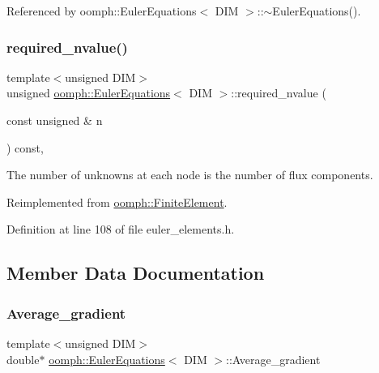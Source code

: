 Referenced by oomph\+::\+Euler\+Equations$<$ D\+I\+M $>$\+::$\sim$\+Euler\+Equations().

\mbox{\label{classoomph_1_1EulerEquations_a94116a7673c825ab36ed1d57f3cb8a62}} 
\subsubsection{\texorpdfstring{required\+\_\+nvalue()}{required\_nvalue()}}
{\footnotesize\ttfamily template$<$unsigned D\+IM$>$ \\
unsigned \hyperlink{classoomph_1_1EulerEquations}{oomph\+::\+Euler\+Equations}$<$ D\+IM $>$\+::required\+\_\+nvalue (\begin{DoxyParamCaption}\item[{const unsigned \&}]{n }\end{DoxyParamCaption}) const\hspace{0.3cm}{\ttfamily [inline]}, {\ttfamily [virtual]}}



The number of unknowns at each node is the number of flux components. 



Reimplemented from \hyperlink{classoomph_1_1FiniteElement_a56610c60d5bc2d7c27407a1455471b1a}{oomph\+::\+Finite\+Element}.



Definition at line 108 of file euler\+\_\+elements.\+h.



\subsection{Member Data Documentation}
\mbox{\label{classoomph_1_1EulerEquations_a716de77d64cecd2947b6f2cbf3effbda}} 
\subsubsection{\texorpdfstring{Average\+\_\+gradient}{Average\_gradient}}
{\footnotesize\ttfamily template$<$unsigned D\+IM$>$ \\
double$\ast$ \hyperlink{classoomph_1_1EulerEquations}{oomph\+::\+Euler\+Equations}$<$ D\+IM $>$\+::Average\+\_\+gradient\hspace{0.3cm}{\ttfamily [private]}}



